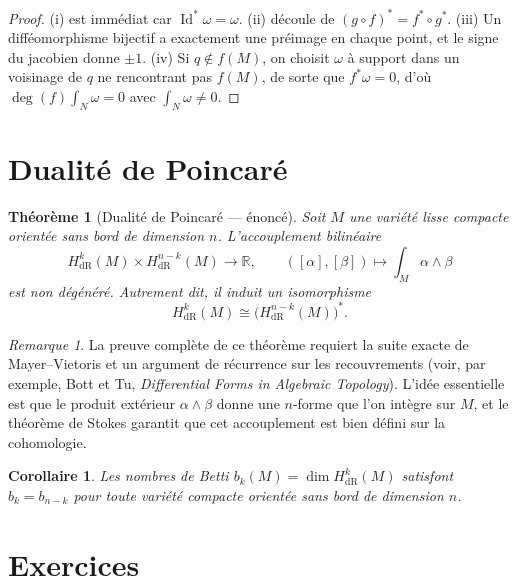 \documentclass[12pt,a4paper,openany]{book}
\theoremstyle{definition}
\theoremstyle{plain}
\newtheorem{theoreme}[definition]{Théorème}
\newtheorem{corollaire}[definition]{Corollaire}
\theoremstyle{remark}
\newtheorem{remarque}[definition]{Remarque}
\newcommand{\R}{\mathbb{R}}
\DeclareMathOperator{\Id}{Id}
\begin{document}
\begin{proof}
(i) est immédiat car $\Id^*\omega = \omega$.
(ii) découle de $(g\circ f)^* = f^* \circ g^*$.
(iii) Un difféomorphisme bijectif a exactement une préimage en chaque point,
et le signe du jacobien donne $\pm 1$.
(iv) Si $q \notin f(M)$, on choisit $\omega$ à support dans un voisinage de
$q$ ne rencontrant pas $f(M)$, de sorte que $f^*\omega = 0$, d'où
$\deg(f) \int_N \omega = 0$ avec $\int_N \omega \neq 0$.
\end{proof}

\section{Dualité de Poincaré}\label{sec:dualite-poincare}

\begin{theoreme}[Dualité de Poincaré --- énoncé]\label{thm:dualite-poincare}
Soit $M$ une variété lisse compacte orientée sans bord de dimension $n$.
L'accouplement bilinéaire
\[
  H^k_{\mathrm{dR}}(M) \times H^{n-k}_{\mathrm{dR}}(M) \to \R,
  \qquad ([\alpha], [\beta]) \mapsto \int_M \alpha \wedge \beta
\]
est non dégénéré. Autrement dit, il induit un isomorphisme
\[
  H^k_{\mathrm{dR}}(M) \cong \bigl(H^{n-k}_{\mathrm{dR}}(M)\bigr)^*.
\]
\end{theoreme}

\begin{remarque}\label{rem:dualite-poincare}
La preuve complète de ce théorème requiert la suite exacte de
Mayer--Vietoris et un argument de récurrence sur
les recouvrements (voir, par exemple, Bott et Tu,
\textit{Differential Forms in Algebraic Topology}). L'idée essentielle est
que le produit extérieur $\alpha \wedge \beta$ donne une $n$-forme que l'on
intègre sur $M$, et le théorème de Stokes garantit que cet accouplement est
bien défini sur la cohomologie.
\end{remarque}

\begin{corollaire}\label{cor:betti-dualite}
Les nombres de Betti $b_k(M) = \dim H^k_{\mathrm{dR}}(M)$ satisfont
$b_k = b_{n-k}$ pour toute variété compacte orientée sans bord de dimension $n$.
\end{corollaire}

\section{Exercices}\label{sec:exos-stokes}
\end{document}
